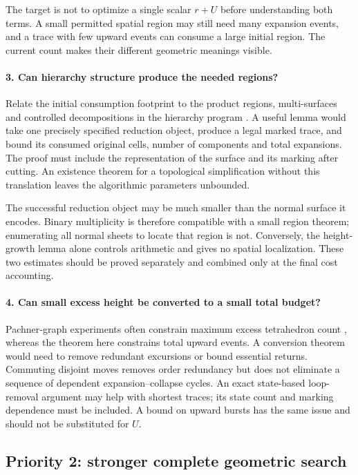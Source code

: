 The target is not to optimize a single scalar $r+U$ before understanding
both terms. A small permitted spatial region may still need many expansion
events, and a trace with few upward events can consume a large initial
region. The current count makes their different geometric meanings visible.

\paragraph{3. Can hierarchy structure produce the needed regions?}
Relate the initial consumption footprint to the product regions,
multi-surfaces and controlled decompositions in the hierarchy program
\cite{LackenbyTalk,Lackenby2026}. A useful lemma would take one precisely
specified reduction object, produce a legal marked trace, and bound its
consumed original cells, number of components and total expansions. The
proof must include the representation of the surface and its marking after
cutting. An existence theorem for a topological simplification without this
translation leaves the algorithmic parameters unbounded.

The successful reduction object may be much smaller than the normal surface
it encodes. Binary multiplicity is therefore compatible with a small region
theorem; enumerating all normal sheets to locate that region is not.
Conversely, the height-growth lemma alone controls arithmetic and gives
no spatial localization. These two estimates should be proved separately
and combined only at the final cost accounting.

\paragraph{4. Can small excess height be converted to a small total budget?}
Pachner-graph experiments often constrain maximum excess tetrahedron count
\cite{BurtonPachner}, whereas the theorem here constrains total upward
events. A conversion theorem would need to remove redundant excursions or
bound essential returns. Commuting disjoint moves removes order redundancy
but does not eliminate a sequence of dependent expansion--collapse cycles.
An exact state-based loop-removal argument may help with shortest traces;
its state count and marking dependence must be included. A bound on upward
bursts has the same issue and should not be substituted for $U$.

\subsection{Priority 2: stronger complete geometric search}

